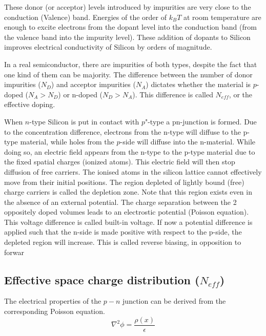 These donor (or acceptor) levels introduced by impurities are very close to the conduction (Valence) band. Energies of the order of $k_B T$ at room temperature are enough to excite electrons from the dopant level into the conduction band (from the valence band into the impurity level). These addition of dopants to Silicon improves electrical conductivity of Silicon by orders of magnitude.

In a real semiconductor, there are impurities of both types, despite the fact that one kind of them can be majority. The difference between the number of donor impurities ($N_D$) and acceptor impurities ($N_A$) dictates whether the material is $p$-doped ($N_A > N_D $) or n-doped ($N_D > N_A$). This difference is called $N_{eff}$, or the effective doping.

When $n$-type Silicon is put in contact with $p$"-type a pn-junction is formed. Due to the concentration difference, electrons from the n-type will diffuse to the p-type material, while holes from the $p$-side will diffuse into the n-material. While doing so, an electric field appears from the n-type to the p-type material due to the fixed spatial charges (ionized atoms). This electric field will then stop diffusion of free carriers. The ionised atoms in the silicon lattice cannot effectively move from their initial positions. The region depleted of lightly bound (free) charge carriers is called the depletion zone. Note that this region exists even in the absence of an external potential. The charge separation between the 2 oppositely doped volumes leads to an electrostic potential (Poisson equation). This voltage difference is called built-in voltage. If now a potential difference is applied such that the n-side is made positive with respect to the p-side, the depleted region will increase. This is called reverse biasing, in opposition to forwar


\subsection{Effective space charge distribution ($N_{eff}$)} 

The electrical properties of the $p-n$ junction can be derived from the corresponding Poisson equation. 
\begin{equation}
\nabla^2 \phi = \frac{\rho(x)}{\epsilon} 
\label{eq:poisson}
\end{equation}

